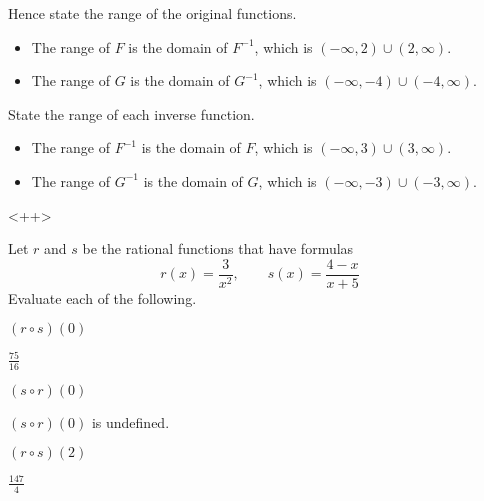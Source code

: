 \begin{exercises}
\begin{problem}
\begin{subproblem}
\end{subproblem}
\begin{subproblem}
	Hence state the range of the original functions.
	\begin{shortsolution}
		\begin{itemize}
			\item The range of $F$ is the domain of $F^{-1}$, which is $(-\infty,2)\cup(2,\infty)$.
			\item The range of $G$ is the domain of $G^{-1}$, which is $(-\infty,-4)\cup(-4,\infty)$.
		\end{itemize}
	\end{shortsolution}
\end{subproblem}
\begin{subproblem}
	State the range of each inverse function.
	\begin{shortsolution}
		\begin{itemize}
			\item The range of $F^{-1}$ is the domain of $F$, which is $(-\infty,3)\cup(3,\infty)$.
			\item The range of $G^{-1}$ is the domain of $G$, which is $(-\infty,-3)\cup(-3,\infty)$.
		\end{itemize}<++>
	\end{shortsolution}
\end{subproblem}
\end{problem}
\begin{problem}[Composition]
Let $r$ and $s$ be the rational functions that have formulas
\[
	r(x)=\frac{3}{x^2},\qquad s(x)=\frac{4-x}{x+5}
\]
Evaluate each of the following.
\begin{multicols}{3}
	\begin{subproblem}
		$(r\circ s)(0)$
		\begin{shortsolution}
			$\frac{75}{16}$
		\end{shortsolution}
	\end{subproblem}
	\begin{subproblem}
		$(s\circ r)(0)$
		\begin{shortsolution}
			$(s\circ r)(0)$ is undefined.
		\end{shortsolution}
	\end{subproblem}
	\begin{subproblem}
		$(r\circ s)(2)$
		\begin{shortsolution}
			$\frac{147}{4}$
		\end{shortsolution}

\end{subproblem}
\end{multicols}
\end{problem}
\end{exercises}
